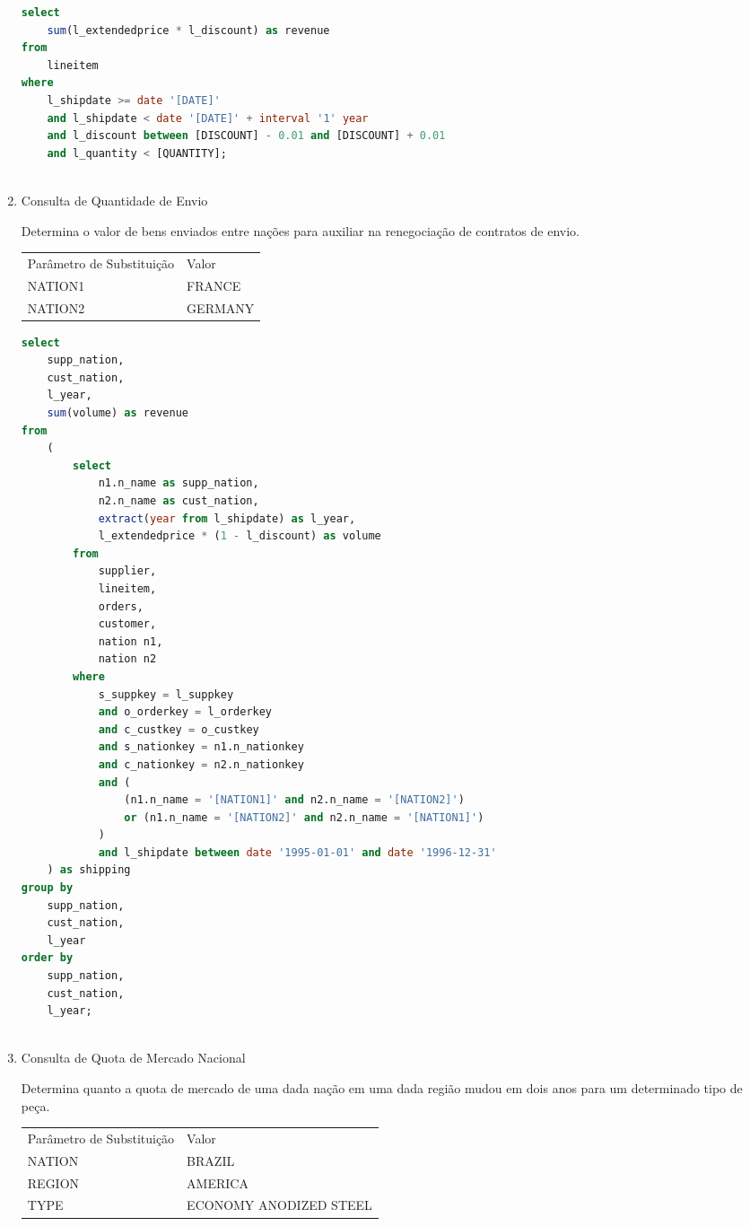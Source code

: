\begin{enumerate}
	\begin{lstlisting}[language=SQL]
select
	sum(l_extendedprice * l_discount) as revenue
from
	lineitem
where
	l_shipdate >= date '[DATE]'
	and l_shipdate < date '[DATE]' + interval '1' year
	and l_discount between [DISCOUNT] - 0.01 and [DISCOUNT] + 0.01
	and l_quantity < [QUANTITY];
	
	\end{lstlisting}
	
\item Consulta de Quantidade de Envio

    Determina o valor de bens enviados entre nações para auxiliar na renegociação de contratos de envio.
    
\begin{tabular}{ll}
	Parâmetro de Substituição & Valor\\
	NATION1 & FRANCE\\
	NATION2 & GERMANY\\
\end{tabular}

	\begin{lstlisting}[language=SQL]
select
	supp_nation,
	cust_nation,
	l_year,
	sum(volume) as revenue
from
	(
		select
			n1.n_name as supp_nation,
			n2.n_name as cust_nation,
			extract(year from l_shipdate) as l_year,
			l_extendedprice * (1 - l_discount) as volume
		from
			supplier,
			lineitem,
			orders,
			customer,
			nation n1,
			nation n2
		where
			s_suppkey = l_suppkey
			and o_orderkey = l_orderkey
			and c_custkey = o_custkey
			and s_nationkey = n1.n_nationkey
			and c_nationkey = n2.n_nationkey
			and (
				(n1.n_name = '[NATION1]' and n2.n_name = '[NATION2]')
				or (n1.n_name = '[NATION2]' and n2.n_name = '[NATION1]')
			)
			and l_shipdate between date '1995-01-01' and date '1996-12-31'
	) as shipping
group by
	supp_nation,
	cust_nation,
	l_year
order by
	supp_nation,
	cust_nation,
	l_year;
	
	\end{lstlisting}

\item Consulta de Quota de Mercado Nacional

    Determina quanto a quota de mercado de uma dada nação em uma dada região mudou em dois anos para um determinado tipo de peça.
    
\begin{tabular}{ll}
	Parâmetro de Substituição & Valor\\
	NATION & BRAZIL\\
	REGION & AMERICA\\
	TYPE &  ECONOMY ANODIZED STEEL\\
\end{tabular}


\end{enumerate}
